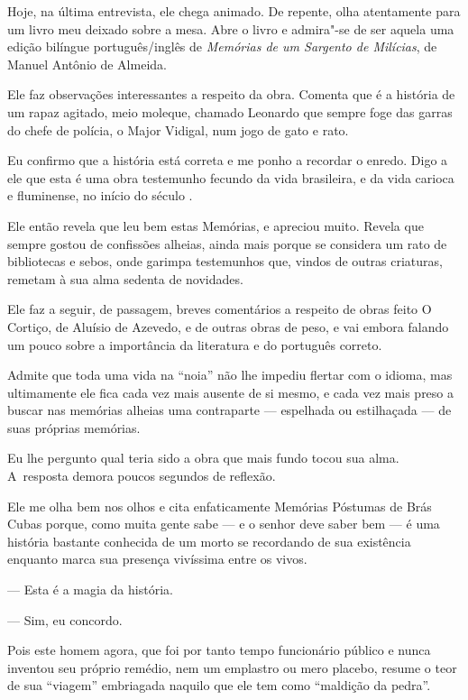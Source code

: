 \asterisc{}

Hoje, na última entrevista, ele chega animado. De repente, olha
atentamente para um livro meu deixado sobre a mesa. Abre o livro e
admira"-se de ser aquela uma edição bilíngue português/inglês de \emph{Memórias
de um Sargento de Milícias}, de Manuel Antônio de Almeida.

Ele faz observações interessantes a respeito da obra. Comenta que é a
história de um rapaz agitado, meio moleque, chamado Leonardo que sempre
foge das garras do chefe de polícia, o Major Vidigal, num jogo de gato e
rato.

Eu confirmo que a história está correta e me ponho a recordar o enredo.
Digo a ele que esta é uma obra testemunho fecundo da vida brasileira, e
da vida carioca e fluminense, no início do século .

Ele então revela que leu bem estas Memórias, e apreciou muito. Revela
que sempre gostou de confissões alheias, ainda mais porque se considera
um rato de bibliotecas e sebos, onde garimpa testemunhos que, vindos de
outras criaturas, remetam à sua alma sedenta de novidades.

Ele faz a seguir, de passagem, breves comentários a respeito de obras
feito O Cortiço, de Aluísio de Azevedo, e de outras obras de peso, e vai
embora falando um pouco sobre a importância da literatura e do português
correto.

Admite que toda uma vida na ``noia'' não lhe impediu flertar com o
idioma, mas ultimamente ele fica cada vez mais ausente de si mesmo, e
cada vez mais preso a buscar nas memórias alheias uma contraparte ---
espelhada ou estilhaçada --- de suas próprias memórias.

Eu lhe pergunto qual teria sido a obra que mais fundo tocou sua alma. A~resposta demora poucos segundos de reflexão.

Ele me olha bem nos olhos e cita enfaticamente Memórias Póstumas de Brás
Cubas porque, como muita gente sabe --- e o senhor deve saber bem --- é
uma história bastante conhecida de um morto se recordando de sua
existência enquanto marca sua presença vivíssima entre os vivos.

— Esta é a magia da história.

— Sim, eu concordo.

Pois este homem agora, que foi por tanto tempo funcionário público e
nunca inventou seu próprio remédio, nem um emplastro ou mero placebo,
resume o teor de sua ``viagem'' embriagada naquilo que ele tem como
``maldição da pedra''.

